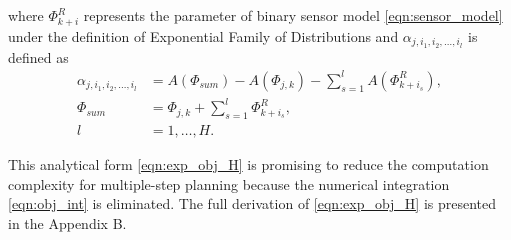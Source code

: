 \documentclass[twocolumn,10pt]{asme2e}
\begin{document}
where $\Phi^R_{k+i}$ represents the parameter of binary sensor model \cref{eqn:sensor_model} under the definition of Exponential Family of Distributions and $\alpha_{j,i_1,i_2,\dots,i_l}$ is defined as
\begin{subequations}
	\begin{align*}
	\alpha_{j,i_1,i_2,\dots,i_l}&=A(\Phi_{sum})-A(\Phi_{j,k})-\sum^{l}_{s=1}A(\Phi^R_{k+i_s}),\\
	\Phi_{sum}&=\Phi_{j,k}+\sum^{l}_{s=1}\Phi^R_{k+i_s},\\
	l&=1,\dots,H.
	\end{align*}
\end{subequations}

This analytical form \cref{eqn:exp_obj_H} is promising to reduce the computation complexity for multiple-step planning because the numerical integration \cref{eqn:obj_int} is eliminated.
The full derivation of \cref{eqn:exp_obj_H} is presented in the Appendix B.

\end{document}
